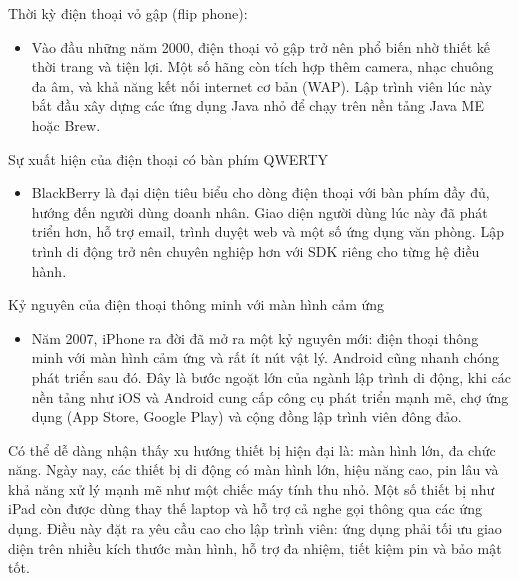   \begin{flushleft}
    \hspace*{0.8cm}Thời kỳ điện thoại vỏ gập (flip phone):
    \setlength{\leftmargini}{1.5cm}
    \begin{itemize}
        \item Vào đầu những năm 2000, điện thoại vỏ gập trở nên phổ biến nhờ thiết kế thời trang và tiện lợi. Một số hãng còn tích hợp thêm camera, nhạc chuông đa âm, và khả năng kết nối internet cơ bản (WAP). Lập trình viên lúc này bắt đầu xây dựng các ứng dụng Java nhỏ để chạy trên nền tảng Java ME hoặc Brew.
    \end{itemize}
\end{flushleft}

\begin{flushleft}
  \hspace*{0.8cm}Sự xuất hiện của điện thoại có bàn phím QWERTY
  \setlength{\leftmargini}{1.5cm}
  \begin{itemize}
      \item BlackBerry là đại diện tiêu biểu cho dòng điện thoại với bàn phím đầy đủ, hướng đến người dùng doanh nhân. Giao diện người dùng lúc này đã phát triển hơn, hỗ trợ email, trình duyệt web và một số ứng dụng văn phòng. Lập trình di động trở nên chuyên nghiệp hơn với SDK riêng cho từng hệ điều hành.
  \end{itemize}
\end{flushleft}

\begin{flushleft}
  \hspace*{0.8cm}Kỷ nguyên của điện thoại thông minh với màn hình cảm ứng
  \setlength{\leftmargini}{1.5cm}
  \begin{itemize}
      \item Năm 2007, iPhone ra đời đã mở ra một kỷ nguyên mới: điện thoại thông minh với màn hình cảm ứng và rất ít nút vật lý. Android cũng nhanh chóng phát triển sau đó. Đây là bước ngoặt lớn của ngành lập trình di động, khi các nền tảng như iOS và Android cung cấp công cụ phát triển mạnh mẽ, chợ ứng dụng (App Store, Google Play) và cộng đồng lập trình viên đông đảo.
  \end{itemize}
\end{flushleft}

\begin{flushleft}
  \hspace*{0.8cm} Có thể dễ dàng nhận thấy xu hướng thiết bị hiện đại là: màn hình lớn, đa chức năng. Ngày nay, các thiết bị di động có màn hình lớn, hiệu năng cao, pin lâu và khả năng xử lý mạnh mẽ như một chiếc máy tính thu nhỏ. Một số thiết bị như iPad còn được dùng thay thế laptop và hỗ trợ cả nghe gọi thông qua các ứng dụng. Điều này đặt ra yêu cầu cao cho lập trình viên: ứng dụng phải tối ưu giao diện trên nhiều kích thước màn hình, hỗ trợ đa nhiệm, tiết kiệm pin và bảo mật tốt.
\end{flushleft}

